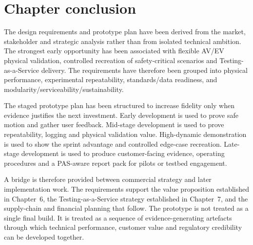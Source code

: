 \section{Chapter conclusion}
\label{sec:ch8_conclusion}

The design requirements and prototype plan have been derived from the market, stakeholder and strategic analysis rather than from isolated technical ambition. The strongest early opportunity has been associated with flexible AV/EV physical validation, controlled recreation of safety-critical scenarios and Testing-as-a-Service delivery. The requirements have therefore been grouped into physical performance, experimental repeatability, standards/data readiness, and modularity/serviceability/sustainability.

The staged prototype plan has been structured to increase fidelity only when evidence justifies the next investment. Early development is used to prove safe motion and gather user feedback. Mid-stage development is used to prove repeatability, logging and physical validation value. High-dynamic demonstration is used to show the sprint advantage and controlled edge-case recreation. Late-stage development is used to produce customer-facing evidence, operating procedures and a PAS-aware report pack for pilots or testbed engagement.

A bridge is therefore provided between commercial strategy and later implementation work. The requirements support the value proposition established in Chapter~6, the Testing-as-a-Service strategy established in Chapter~7, and the supply-chain and financial planning that follow. The prototype is not treated as a single final build. It is treated as a sequence of evidence-generating artefacts through which technical performance, customer value and regulatory credibility can be developed together.
